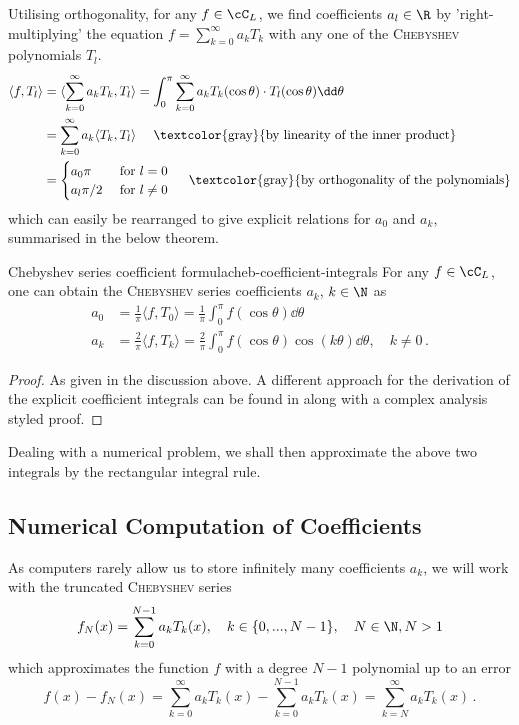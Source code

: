 \documentclass[12pt, a4paper]{article}
\newcommand{\chebyshev}{\textsc{Chebyshev}\xspace}
\begin{document}
  Utilising orthogonality, for any $f \in \cC_L$, we find coefficients $a_l \in \R$ by 'right-multiplying' the equation $f = \sum_{k=0}^\infty a_k T_k$ with any one of the \chebyshev polynomials $T_l$.
  \begin{align*}
    \langle f, T_l \rangle & = \langle \sum_{k=0}^\infty a_k T_k, T_l \rangle = \int_0^\pi \sum_{k=0}^\infty a_k T_k(\cos \theta) \cdot T_l(\cos \theta) \dd\theta \\
                           & = \sum_{k=0}^\infty a_k \langle T_k, T_l \rangle \quad \text{ \textcolor{gray}{by linearity of the inner product}}                    \\
                           & = \begin{cases}
                                 a_0 \pi   & \text{ for } l = 0    \\
                                 a_l \pi/2 & \text{ for } l \neq 0
                               \end{cases} \quad \text{ \textcolor{gray}{by orthogonality of the polynomials}}
  \end{align*}
  which can easily be rearranged to give explicit relations for $a_0$ and $a_k$, summarised in the below theorem.
  \begin{theorem}{Chebyshev series coefficient formula}{cheb-coefficient-integrals}
    For any $f \in \cC_L$, one can obtain the \chebyshev series coefficients $a_k$, $k \in \N$ as
    \begin{align*}
      a_0 & = \frac{1}{\pi} \langle f, T_0 \rangle =  \frac{1}{\pi} \int_0^\pi f(\cos \theta) \dd\theta                                   \\
      a_k & = \frac{2}{\pi} \langle f, T_k \rangle = \frac{2}{\pi} \int_0^\pi f(\cos \theta) \cos(k \theta) \dd\theta, \quad k \neq 0 \,.
    \end{align*}
  \end{theorem}
  \begin{proof}
    As given in the discussion above.
    A different approach for the derivation of the explicit coefficient integrals can be found in \cite{atap} along with a complex analysis styled proof.
  \end{proof}

  Dealing with a numerical problem, we shall then approximate the above two integrals by the rectangular integral rule.

  \subsection{Numerical Computation of Coefficients}
  \label{subsection:numerical-coeffs}
  As computers rarely allow us to store infinitely many coefficients $a_k$, we will work with the truncated \chebyshev series
  \begin{equation}
    f_N(x) = \sum_{k=0}^{N-1} a_k T_k(x), \quad k \in \{0, ..., N-1\},\quad N \in \N, N > 1
    \label{eq:truncated-cheb-series}
  \end{equation}
  which approximates the function $f$ with a degree $N-1$ polynomial up to an error
  $$f(x) - f_N(x) = \sum_{k=0}^{\infty} a_k T_k(x) - \sum_{k=0}^{N-1} a_k T_k(x) = \sum_{k=N}^{\infty} a_k T_k(x) \,.$$
\end{document}
